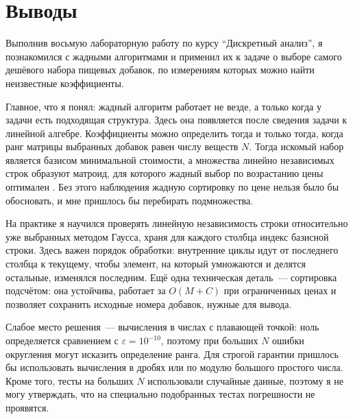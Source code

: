 \section{Выводы}
Выполнив восьмую лабораторную работу по курсу \enquote{Дискретный анализ}, я
познакомился с жадными алгоритмами и применил их к задаче о выборе самого
дешёвого набора пищевых добавок, по измерениям которых можно найти неизвестные коэффициенты.

Главное, что я понял: жадный алгоритм работает не везде, а только когда у задачи
есть подходящая структура. Здесь она появляется после сведения задачи к линейной алгебре.
Коэффициенты можно определить тогда и только тогда, когда ранг матрицы выбранных
добавок равен числу веществ $N$. Тогда искомый набор является базисом минимальной
стоимости, а множества линейно независимых строк образуют матроид, для
которого жадный выбор по возрастанию цены оптимален \cite{Kormen}. Без этого
наблюдения жадную сортировку по цене нельзя было бы обосновать, и мне пришлось бы перебирать подмножества.

На практике я научился проверять линейную независимость строки относительно
уже выбранных методом Гаусса, храня для каждого столбца индекс базисной строки.
Здесь важен порядок обработки: внутренние циклы идут от последнего столбца к текущему,
чтобы элемент, на который умножаются и делятся остальные, изменялся последним.
Ещё одна техническая деталь~--- сортировка подсчётом: она устойчива, работает
за $O(M + C)$ при ограниченных ценах и позволяет сохранить исходные номера добавок, нужные для вывода.

Слабое место решения~--- вычисления в числах с плавающей точкой: ноль определяется
сравнением с $\varepsilon = 10^{-10}$, поэтому при больших $N$ ошибки округления
могут исказить определение ранга. Для строгой гарантии пришлось бы использовать
вычисления в дробях или по модулю большого простого числа. Кроме того, тесты на
больших $N$ использовали случайные данные, поэтому я не могу утверждать, что на
специально подобранных тестах погрешности не проявятся.

\pagebreak